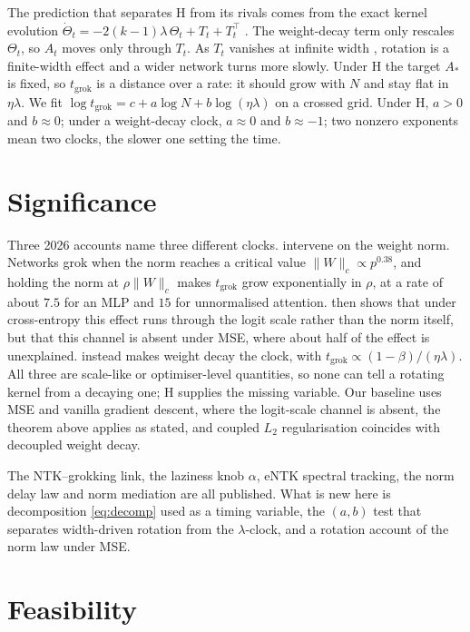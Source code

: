 \documentclass[a4paper,11pt]{article} %
\newcommand{\tgrok}{t_{\mathrm{grok}}}
\begin{document}
The prediction that separates H from its rivals comes from the exact kernel
evolution $\dot\Theta_t=-2(k-1)\lambda\,\Theta_t+T_t+T_t^\top$
\citep[Eq.~S5, arXiv v1]{lewkowycz2020l2}. The weight-decay term only rescales
$\Theta_t$, so $A_t$ moves only through $T_t$.
As $T_t$ vanishes at infinite width \citep{jacot2018ntk,lewkowycz2020l2},
rotation is a finite-width effect and a wider network turns more slowly. Under
H the target $A_*$ is fixed, so $\tgrok$ is a distance over a rate: it should
grow with $N$ and stay flat in $\eta\lambda$. We fit $\log\tgrok=c+a\log N+b\log(\eta\lambda)$ on a crossed
grid. Under H, $a>0$ and $b\approx0$; under a weight-decay clock, $a\approx0$
and $b\approx-1$; two nonzero exponents mean two clocks, the slower one setting the time.

\section{Significance}

Three 2026 accounts name three different clocks.
\citet{truong2026norm} intervene on the weight norm.
Networks grok when the norm reaches a critical value
$\lVert W\rVert_c\propto p^{0.38}$, and holding the norm at
$\rho\lVert W\rVert_c$ makes $\tgrok$ grow exponentially in $\rho$, at a rate of
about $7.5$ for an MLP and $15$ for unnormalised attention.
\citet{truong2026logit} then shows that under cross-entropy this effect runs
through the logit scale rather than the norm itself, but that this channel is
absent under MSE, where about half of the effect is unexplained.
\citet{kim2026clock} instead makes weight decay the clock, with
$\tgrok\propto(1-\beta)/(\eta\lambda)$. All three are scale-like or
optimiser-level quantities, so none can tell a rotating kernel from a decaying
one; H supplies the missing variable. Our baseline uses MSE and vanilla
gradient descent, where the logit-scale channel is absent, the theorem above
applies as stated, and coupled $L_2$ regularisation coincides with decoupled
weight decay.

The NTK--grokking link, the laziness knob $\alpha$, eNTK spectral tracking,
the norm delay law and norm mediation are all published. What is new here is
decomposition \eqref{eq:decomp} used as a timing variable, the $(a,b)$ test
that separates width-driven rotation from the $\lambda$-clock, and a rotation
account of the norm law under MSE.

\section{Feasibility}
\end{document}
